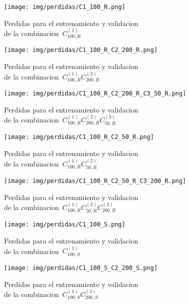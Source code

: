 \begin{figure}[H]
    \centerline{\texttt{[image: img/perdidas/C1\_100\_R.png]}}
    \caption{Perdidas para el entrenamiento y validacion\\ de la combinacion~$C^{(1)}_{100,R}$}
    \label{fig:C1_100_R}
\end{figure}

\begin{figure}[H]
    \centerline{\texttt{[image: img/perdidas/C1\_100\_R\_C2\_200\_R.png]}}
    \caption{Perdidas para el entrenamiento y validacion\\ de la combinacion~$C^{(1)}_{100,R}C^{(2)}_{200,R}$}
    \label{fig:C1_100_R_C2_200_R}
\end{figure}

\begin{figure}[H]
    \centerline{\texttt{[image: img/perdidas/C1\_100\_R\_C2\_200\_R\_C3\_50\_R.png]}}
    \caption{Perdidas para el entrenamiento y validacion\\ de la combinacion~$C^{(1)}_{100,R}C^{(2)}_{200,R}C^{(3)}_{50,R}$}
    \label{fig:C1_100_R_C2_200_R_C3_50_R}
\end{figure}

\begin{figure}[H]
    \centerline{\texttt{[image: img/perdidas/C1\_100\_R\_C2\_50\_R.png]}}
    \caption{Perdidas para el entrenamiento y validacion\\ de la combinacion~$C^{(1)}_{100,R}C^{(2)}_{50,R}$}
    \label{fig:C1_100_R_C2_50_R}
\end{figure}

\begin{figure}[H]
    \centerline{\texttt{[image: img/perdidas/C1\_100\_R\_C2\_50\_R\_C3\_200\_R.png]}}
    \caption{Perdidas para el entrenamiento y validacion\\ de la combinacion~$C^{(1)}_{100,R}C^{(2)}_{50,R}C^{(3)}_{200,R}$}
    \label{fig:C1_100_R_C2_50_R_C3_200_R}
\end{figure}

\begin{figure}[H]
    \centerline{\texttt{[image: img/perdidas/C1\_100\_S.png]}}
    \caption{Perdidas para el entrenamiento y validacion\\ de la combinacion~$C^{(1)}_{100,S}$}
    \label{fig:C1_100_S}
\end{figure}

\begin{figure}[H]
    \centerline{\texttt{[image: img/perdidas/C1\_100\_S\_C2\_200\_S.png]}}
    \caption{Perdidas para el entrenamiento y validacion\\ de la combinacion~$C^{(1)}_{100,S}C^{(2)}_{200,S}$}
    \label{fig:C1_100_S_C2_200_S}
\end{figure}

